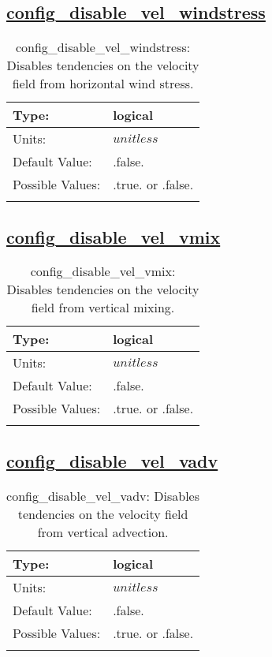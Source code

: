 \subsection[config\_disable\_vel\_windstress]{\hyperref[sec:nm_tab_debug]{config\_disable\_vel\_windstress}}
\label{subsec:nm_sec_config_disable_vel_windstress}
\begin{center}
\begin{longtable}{| p{2.0in} | p{4.0in} |}
    \hline
    Type: & logical \\
    \hline
    Units: & $unitless$ \\
    \hline
    Default Value: & .false. \\
    \hline
    Possible Values: & .true. or .false. \\
    \hline
    \caption{config\_disable\_vel\_windstress: Disables tendencies on the velocity field from horizontal wind stress.}
\end{longtable}
\end{center}
\subsection[config\_disable\_vel\_vmix]{\hyperref[sec:nm_tab_debug]{config\_disable\_vel\_vmix}}
\label{subsec:nm_sec_config_disable_vel_vmix}
\begin{center}
\begin{longtable}{| p{2.0in} | p{4.0in} |}
    \hline
    Type: & logical \\
    \hline
    Units: & $unitless$ \\
    \hline
    Default Value: & .false. \\
    \hline
    Possible Values: & .true. or .false. \\
    \hline
    \caption{config\_disable\_vel\_vmix: Disables tendencies on the velocity field from vertical mixing.}
\end{longtable}
\end{center}
\subsection[config\_disable\_vel\_vadv]{\hyperref[sec:nm_tab_debug]{config\_disable\_vel\_vadv}}
\label{subsec:nm_sec_config_disable_vel_vadv}
\begin{center}
\begin{longtable}{| p{2.0in} | p{4.0in} |}
    \hline
    Type: & logical \\
    \hline
    Units: & $unitless$ \\
    \hline
    Default Value: & .false. \\
    \hline
    Possible Values: & .true. or .false. \\
    \hline
    \caption{config\_disable\_vel\_vadv: Disables tendencies on the velocity field from vertical advection.}
\end{longtable}
\end{center}
